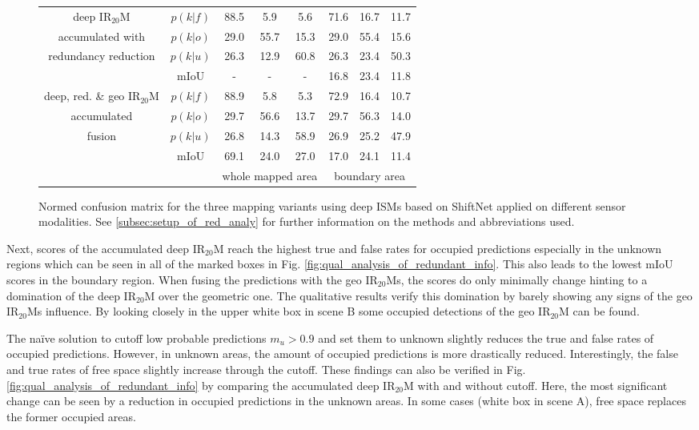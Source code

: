 \begin{figure}[H]
\begin{center}
{\begin{tabular}{c|c|ccc|ccc}
			\hline
			deep IR$_{20}$M &$p(k|f)$ & \textcolor{mygreen}{88.5} & \textcolor{myred}{5.9} & 5.6& \textcolor{mygreen}{71.6} & \textcolor{myred}{16.7} & 11.7 \\
			accumulated with &$p(k|o)$ & \textcolor{myred}{29.0} & \textcolor{mygreen}{55.7} & 15.3& \textcolor{myred}{29.0} & \textcolor{mygreen}{55.4} & 15.6 \\
			redundancy reduction &$p(k|u)$ & 26.3 & 12.9 & 60.8& 26.3 & 23.4 & 50.3 \\
			& mIoU & - & - & - &16.8&23.4&11.8 \\
			\hline
			deep, red. \& geo IR$_{20}$M  &$p(k|f)$ & \textcolor{mygreen}{88.9} & \textcolor{myred}{5.8} & 5.3& \textcolor{mygreen}{72.9} & \textcolor{myred}{16.4} & 10.7 \\
			accumulated&$p(k|o)$ & \textcolor{myred}{29.7} & \textcolor{mygreen}{56.6} & 13.7& \textcolor{myred}{29.7} & \textcolor{mygreen}{56.3} & 14.0 \\
			fusion&$p(k|u)$ & 26.8 & 14.3 & 58.9& 26.9 & 25.2 & 47.9 \\
			& mIoU &69.1&24.0&27.0&17.0&24.1&11.4 \\
			\hline
			& & \multicolumn{3}{c|}{\scriptsize{whole mapped area}} & \multicolumn{3}{c}{\scriptsize{boundary area}}
		\end{tabular}}
		\caption{\label{tab:conf_mat_redunt_info}Normed confusion matrix for the three mapping variants using deep ISMs based on ShiftNet applied on different sensor modalities. See \ref{subsec:setup_of_red_analy} for further information on the methods and abbreviations used.}
	\end{center}
\end{figure}
Next, scores of the accumulated deep IR$_{20}$M reach the highest true and false rates for occupied predictions especially in the unknown regions which can be seen in all of the marked boxes in Fig. \ref{fig:qual_analysis_of_redundant_info}. This also leads to the lowest mIoU scores in the boundary region. When fusing the predictions with the geo IR$_{20}$Ms, the scores do only minimally change hinting to a domination of the deep IR$_{20}$M over the geometric one. The qualitative results verify this domination by barely showing any signs of the geo IR$_{20}$Ms influence. By looking closely in the upper white box in scene B some occupied detections of the geo IR$_{20}$M can be found.

The na\"ive solution to cutoff low probable predictions $m_u > 0.9$ and set them to unknown slightly reduces the true and false rates of occupied predictions. However, in unknown areas, the amount of occupied predictions is more drastically reduced. Interestingly, the false and true rates of free space slightly increase through the cutoff. These findings can also be verified in Fig. \ref{fig:qual_analysis_of_redundant_info} by comparing the accumulated deep IR$_{20}$M with and without cutoff. Here, the most significant change can be seen by a reduction in occupied predictions in the unknown areas. In some cases (white box in scene A), free space replaces the former occupied areas.

